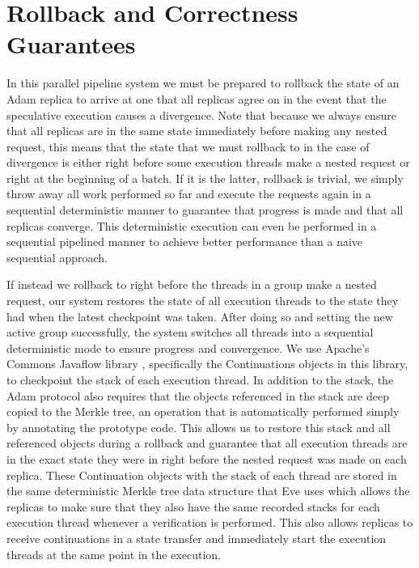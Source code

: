 \documentclass[11pt, oneside]{report}
\begin{document}
\section{Rollback and Correctness Guarantees}

In this parallel pipeline system we must be prepared to rollback the state of an Adam replica to arrive at one that all replicas agree on in the event that the speculative execution causes a divergence. 
Note that because we always ensure that all replicas are in the same state immediately before making any nested request, this means that the state that we must rollback to in the case of divergence is either right before some execution threads make a nested request or right at the beginning of a batch. 
If it is the latter, rollback is trivial, we simply throw away all work performed so far and execute the requests again in a sequential deterministic manner to guarantee that progress is made and that all replicas converge. 
This deterministic execution can even be performed in a sequential pipelined manner to achieve better performance than a naive sequential approach.

If instead we rollback to right before the threads in a group make a nested request, our system restores the state of all execution threads to the state they had when the latest checkpoint was taken. After doing so and setting the new active group successfully, the system switches all threads into a sequential deterministic mode to ensure progress and convergence.
We use Apache's Commons Javaflow library \cite{javaflow}, specifically the Continuations objects in this library, to checkpoint the stack of each execution thread.
In addition to the stack, the Adam protocol also requires that the objects referenced in the stack are deep copied to the Merkle tree, an operation that is automatically performed simply by annotating the prototype code.
This allows us to restore this stack and all referenced objects during a rollback and guarantee that all execution threads are in the exact state they were in right before the nested request was made on each replica.
These Continuation objects with the stack of each thread are stored in the same deterministic Merkle tree data structure that Eve uses which allows the replicas to make sure that they also have the same recorded stacks for each execution thread whenever a verification is performed.
This also allows replicas to receive continuations in a state transfer and immediately start the execution threads at the same point in the execution. 
\end{document}
